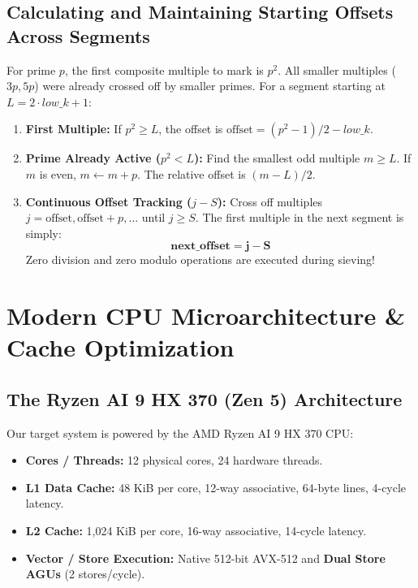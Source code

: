 \documentclass[11pt,a4paper]{article}
\begin{document}
\subsection{Calculating and Maintaining Starting Offsets Across Segments}
For prime $p$, the first composite multiple to mark is $p^2$. All smaller multiples ($3p, 5p$) were already crossed off by smaller primes. For a segment starting at $L = 2 \cdot low\_k + 1$:
\begin{enumerate}\setlength{\itemsep}{0pt}
    \item \textbf{First Multiple:} If $p^2 \ge L$, the offset is $\text{offset} = (p^2 - 1)/2 - low\_k$.
    \item \textbf{Prime Already Active ($p^2 < L$):} Find the smallest odd multiple $m \ge L$. If $m$ is even, $m \leftarrow m + p$. The relative offset is $(m - L) / 2$.
    \item \textbf{Continuous Offset Tracking ($j - S$):} Cross off multiples $j = \text{offset}, \text{offset} + p, \dots$ until $j \ge S$. The first multiple in the next segment is simply:
    \begin{equation}
        \mathbf{\text{next\_offset} = j - S}
    \end{equation}
    Zero division and zero modulo operations are executed during sieving!
\end{enumerate}

\newpage

\section{Modern CPU Microarchitecture \& Cache Optimization}

\subsection{The Ryzen AI 9 HX 370 (Zen 5) Architecture}
Our target system is powered by the AMD Ryzen AI 9 HX 370 CPU:
\begin{itemize}\setlength{\itemsep}{0pt}
    \item \textbf{Cores / Threads:} 12 physical cores, 24 hardware threads.
    \item \textbf{L1 Data Cache:} 48 KiB per core, 12-way associative, 64-byte lines, 4-cycle latency.
    \item \textbf{L2 Cache:} 1,024 KiB per core, 16-way associative, 14-cycle latency.
    \item \textbf{Vector / Store Execution:} Native 512-bit AVX-512 and \textbf{Dual Store AGUs} (2 stores/cycle).
\end{itemize}
\end{document}
